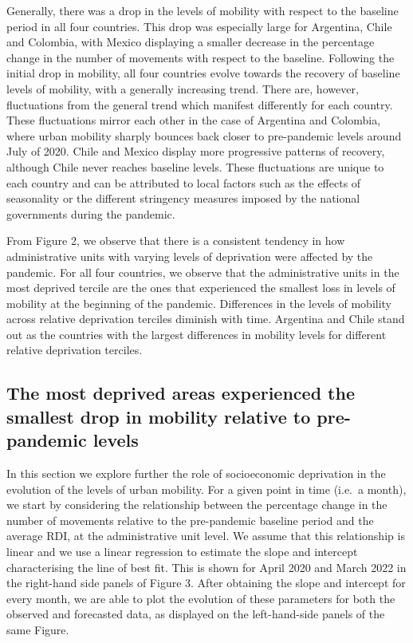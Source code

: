 \documentclass[
  11pt,
]{article}
\begin{document}
Generally, there was a drop in the levels of mobility with respect to
the baseline period in all four countries. This drop was especially
large for Argentina, Chile and Colombia, with Mexico displaying a
smaller decrease in the percentage change in the number of movements
with respect to the baseline. Following the initial drop in mobility,
all four countries evolve towards the recovery of baseline levels of
mobility, with a generally increasing trend. There are, however,
fluctuations from the general trend which manifest differently for each
country. These fluctuations mirror each other in the case of Argentina
and Colombia, where urban mobility sharply bounces back closer to
pre-pandemic levels around July of 2020. Chile and Mexico display more
progressive patterns of recovery, although Chile never reaches baseline
levels. These fluctuations are unique to each country and can be
attributed to local factors such as the effects of seasonality or the
different stringency measures imposed by the national governments during
the pandemic.

From Figure 2, we observe that there is a consistent tendency in how
administrative units with varying levels of deprivation were affected by
the pandemic. For all four countries, we observe that the administrative
units in the most deprived tercile are the ones that experienced the
smallest loss in levels of mobility at the beginning of the pandemic.
Differences in the levels of mobility across relative deprivation
terciles diminish with time. Argentina and Chile stand out as the
countries with the largest differences in mobility levels for different
relative deprivation terciles.

\subsection{The most deprived areas experienced the smallest drop in
mobility relative to pre-pandemic
levels}\label{the-most-deprived-areas-experienced-the-smallest-drop-in-mobility-relative-to-pre-pandemic-levels}

In this section we explore further the role of socioeconomic deprivation
in the evolution of the levels of urban mobility. For a given point in
time (i.e.~a month), we start by considering the relationship between
the percentage change in the number of movements relative to the
pre-pandemic baseline period and the average RDI, at the administrative
unit level. We assume that this relationship is linear and we use a
linear regression to estimate the slope and intercept characterising the
line of best fit. This is shown for April 2020 and March 2022 in the
right-hand side panels of Figure 3. After obtaining the slope and
intercept for every month, we are able to plot the evolution of these
parameters for both the observed and forecasted data, as displayed on
the left-hand-side panels of the same Figure.
\end{document}
